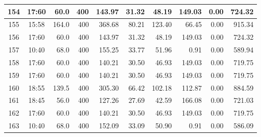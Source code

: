 \begin{landscape}
\begin{longtable}{|c|c|r|r|r|r|r|r|r|r|}
\hline
154 & 17:60 & 60.0 & 400 & 143.97 & 31.32 & 48.19 & 149.03 & 0.00 & 724.32 \\
\hline
\rowcolor{gray!8}
155 & 15:58 & 164.0 & 400 & 368.68 & 80.21 & 123.40 & 66.45 & 0.00 & 915.34 \\
\hline
156 & 17:60 & 60.0 & 400 & 143.97 & 31.32 & 48.19 & 149.03 & 0.00 & 724.32 \\
\hline
\rowcolor{gray!8}
157 & 10:40 & 68.0 & 400 & 155.25 & 33.77 & 51.96 & 0.91 & 0.00 & 589.94 \\
\hline
158 & 17:60 & 60.0 & 400 & 140.21 & 30.50 & 46.93 & 149.03 & 0.00 & 719.75 \\
\hline
\rowcolor{gray!8}
159 & 17:60 & 60.0 & 400 & 140.21 & 30.50 & 46.93 & 149.03 & 0.00 & 719.75 \\
\hline
160 & 18:55 & 139.5 & 400 & 305.30 & 66.42 & 102.18 & 112.87 & 0.00 & 884.59 \\
\hline
\rowcolor{gray!8}
161 & 18:45 & 56.0 & 400 & 127.26 & 27.69 & 42.59 & 166.08 & 0.00 & 721.03 \\
\hline
162 & 17:60 & 60.0 & 400 & 140.21 & 30.50 & 46.93 & 149.03 & 0.00 & 719.75 \\
\hline
\rowcolor{gray!8}
163 & 10:40 & 68.0 & 400 & 152.09 & 33.09 & 50.90 & 0.91 & 0.00 & 586.09 \\
\hline
\end{longtable}
\end{landscape}